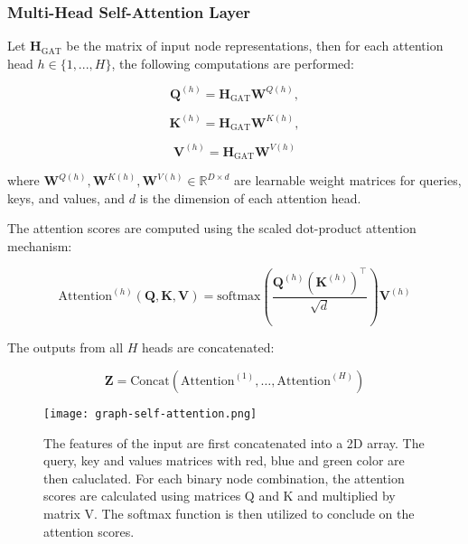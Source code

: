 \documentclass[journal]{IEEEtran}  %
\begin{document}
\subsubsection*{Multi-Head Self-Attention Layer}

Let \( \mathbf{H}_{\text{GAT}} \) be the matrix of input node representations, then for each attention head \( h \in \{1, ..., H\} \), the following computations are performed:

\begin{equation}
\label{eq:MHA_q}
\mathbf{Q}^{(h)} = \mathbf{H}_{\text{GAT}} \mathbf{W}^{Q(h)},
\end{equation}

\begin{equation}
\label{eq:MHA_k}
\mathbf{K}^{(h)} = \mathbf{H}_{\text{GAT}} \mathbf{W}^{K(h)},
\end{equation}

\begin{equation}
\label{eq:MHA_v}
\mathbf{V}^{(h)} = \mathbf{H}_{\text{GAT}} \mathbf{W}^{V(h)}
\end{equation}


where \( \mathbf{W}^{Q(h)}, \mathbf{W}^{K(h)}, \mathbf{W}^{V(h)} \in \mathbb{R}^{D \times d} \) are learnable weight matrices for queries, keys, and values, and \( d \) is the dimension of each attention head.

The attention scores are computed using the scaled dot-product attention mechanism:

\begin{equation}
\label{eq:MHA_attention}
\text{Attention}^{(h)}(\mathbf{Q}, \mathbf{K}, \mathbf{V}) = \text{softmax}\left( \frac{\mathbf{Q}^{(h)} (\mathbf{K}^{(h)})^\top}{\sqrt{d}} \right) \mathbf{V}^{(h)}
\end{equation}

The outputs from all \( H \) heads are concatenated:

\begin{equation}
\label{eq:MHA_concat}
\mathbf{Z} = \text{Concat} \left( \text{Attention}^{(1)}, \dots, \text{Attention}^{(H)} \right)
\end{equation}

\begin{figure}[h!]
  \centering
  \texttt{[image: graph-self-attention.png]}
  \caption{The features of the input are first concatenated into a 2D array. The query, key and values matrices with red, blue and green color are then caluclated. For each binary node combination, the attention scores are calculated using matrices Q and K and multiplied by matrix V. The softmax function is then utilized to conclude on the attention scores.}
  \label{fig:graph-self-attention}
\end{figure}
\end{document}
